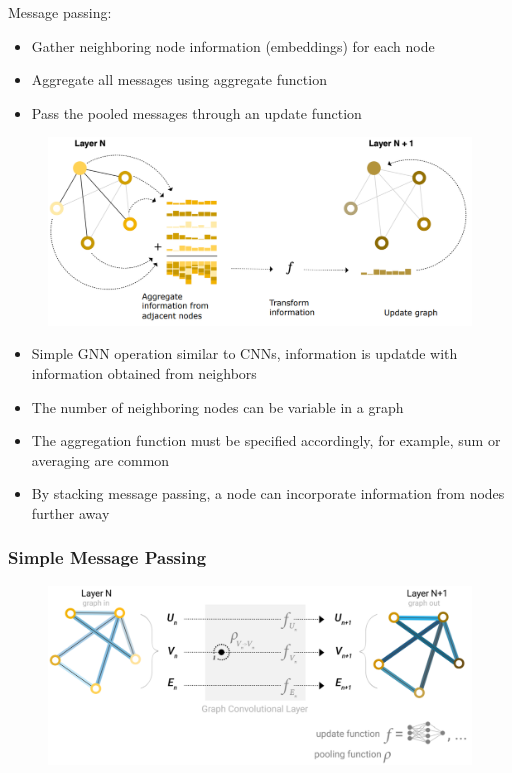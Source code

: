 Message passing:
\begin{itemize}
    \item Gather neighboring node information (embeddings) for each node
    \item Aggregate all messages using aggregate function
    \item Pass the pooled messages through an update function 
\end{itemize}
\begin{figure}[!h]
    \includegraphics[width = \columnwidth]{figures/GraphNeuralNetworks1/MessagePassing.png}
\end{figure}
\begin{itemize}
    \item Simple GNN operation similar to CNNs, information is updatde with information obtained from neighbors
    \item The number of neighboring nodes can be variable in a graph
    \item The aggregation function must be specified accordingly, for example, sum or averaging are common
    \item By stacking message passing, a node can incorporate information from nodes further away
\end{itemize}
\subsubsection{Simple Message Passing}
\begin{figure}[!h]
    \includegraphics[width = \columnwidth]{figures/GraphNeuralNetworks1/SimpleMessagePassing.png}
\end{figure}